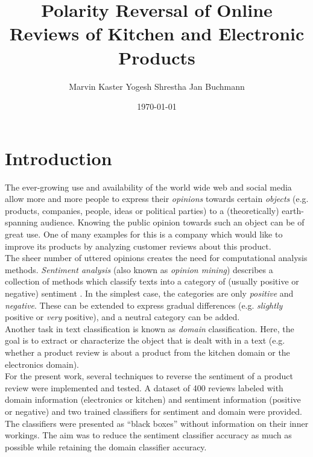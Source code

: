 \documentclass[11pt,a4paper]{article}
\title{Polarity Reversal of Online Reviews of Kitchen and Electronic Products}
\author{Marvin Kaster \And Yogesh Shrestha \And Jan Buchmann}
\date{\today}
\begin{document}
\maketitle


\section{Introduction}
The ever-growing use and availability of the world wide web and social media allow more and more people to express their \textit{opinions} towards certain \textit{objects} (e.g. products, companies, people, ideas or political parties) to a (theoretically) earth-spanning audience. Knowing the public opinion towards such an object can be of great use. One of many examples for this is a company which would like to improve its products by analyzing customer reviews about this product.\\
The sheer number of uttered opinions creates the need for computational analysis methods. \textit{Sentiment analysis} (also known as \textit{opinion mining}) describes a collection of methods which classify texts into a category of (usually positive or negative) sentiment \citep{Liu2012}. In the simplest case, the categories are only \textit{positive} and \textit{negative}. These can be extended to express gradual differences (e.g. \textit{slightly} positive or \textit{very} positive), and a neutral category can be added.\\
Another task in text classification is known as \textit{domain} classification. Here, the goal is to extract or characterize the object that is dealt with in a text (e.g. whether a product review is about a product from the kitchen domain or the electronics domain). \\
For the present work, several techniques   to reverse the sentiment of a product review were implemented and tested. A dataset of 400 reviews labeled with domain information (electronics or kitchen) and sentiment information (positive or negative) and two trained classifiers for sentiment and domain were provided. The classifiers were presented as ``black boxes'' without information on their inner workings. The aim was to reduce the sentiment classifier accuracy as much as possible while retaining the domain classifier accuracy.
\end{document}
